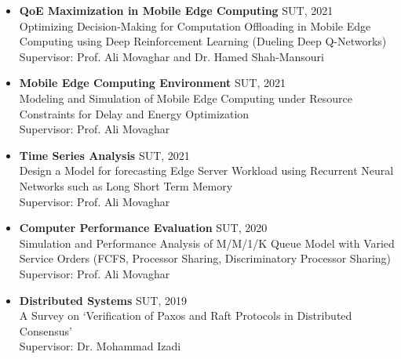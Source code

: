 \documentclass[11pt]{article}
\begin{document}
\begin{itemize}
	
	
		
	\item \textbf{QoE Maximization in Mobile Edge Computing} \hfill SUT, 2021\\
	Optimizing Decision-Making for Computation Offloading in Mobile Edge Computing using Deep Reinforcement Learning (Dueling Deep Q-Networks) \href{https://github.com/ImanRHT/QOCO}{\faGithub} \\
	Supervisor: Prof.  Ali Movaghar and Dr. Hamed Shah-Mansouri \href{https://scholar.google.com/citations?user=dcjIFccAAAAJ&hl=en&oi=ao}{\small \faExternalLink} 
	
	
	\item \textbf{Mobile Edge Computing Environment} \hfill SUT, 2021\\
	Modeling and Simulation of Mobile Edge Computing under Resource Constraints for Delay and Energy Optimization \href{https://github.com/ImanRHT/MEC_Environment}{\faGithub} \\
	Supervisor: Prof.  Ali Movaghar
	


	
	\item \textbf{Time Series Analysis} \hfill SUT, 2021\\
	Design a Model for forecasting Edge Server Workload using Recurrent Neural Networks such as Long Short Term Memory
	\href{https://github.com/ImanRHT/Time_Series_Prediction}{\faGithub} \\
	Supervisor: Prof.  Ali Movaghar
	
	\item \textbf{Computer Performance Evaluation} \hfill SUT, 2020\\
	Simulation and Performance Analysis of M/M/1/K Queue Model with Varied Service Orders (FCFS, Processor Sharing, Discriminatory Processor Sharing) \href{https://github.com/ImanRHT/MM1K_Queue_Simulation}{\faGithub} \\
	Supervisor: Prof.  Ali Movaghar
	


	\item \textbf{Distributed Systems} \hfill SUT, 2019\\
	A Survey on `Verification of Paxos and Raft Protocols in Distributed Consensus’ \\
	Supervisor: Dr. Mohammad Izadi	\href{https://scholar.google.com/citations?user=On8Cw-MAAAAJ&hl=en&oi=ao}{\small \faExternalLink}



\end{itemize}
\end{document}
